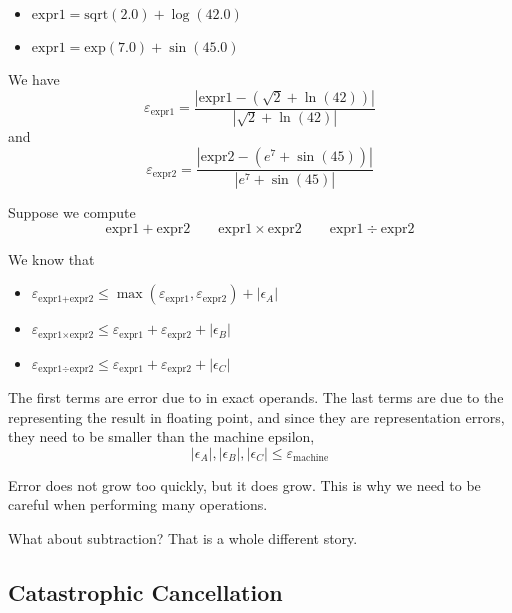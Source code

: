 \begin{example}
    \begin{itemize}
        \item \( \text{expr1} = \text{sqrt}(2.0) + \log(42.0) \)
        \item \( \text{expr1} = \text{exp}(7.0) + \sin(45.0) \)
    \end{itemize}

    We have \[
        \varepsilon_{\text{expr1}} = \frac{|\text{expr1} - (\sqrt{2} + \ln(42))|}{|\sqrt{2} + \ln(42)|}
    \] and \[
        \varepsilon_{\text{expr2}} = \frac{|\text{expr2} - (e^7 + \sin(45))|}{|e^7 + \sin(45)|}
    \]

    Suppose we compute \[
        \text{expr1} + \text{expr2} \qquad \text{expr1} \times \text{expr2} \qquad \text{expr1} \div \text{expr2}
    \]

    We know that
    \begin{itemize}
        \item \( \varepsilon_{\text{expr1} + \text{expr2}} \leq \max( \varepsilon_{\text{expr1}}, \varepsilon_{\text{expr2}}) + | \epsilon_A | \)
        \item \( \varepsilon_{\text{expr1} \times \text{expr2}} \leq \varepsilon_{\text{expr1}} + \varepsilon_{\text{expr2}} + | \epsilon_B | \)
        \item \( \varepsilon_{\text{expr1} \div \text{expr2}} \leq \varepsilon_{\text{expr1}} + \varepsilon_{\text{expr2}} + | \epsilon_C | \)
    \end{itemize}

    The first terms are error due to in exact operands. The last terms are due to the representing the result in floating point, and since they are representation errors, they need to be smaller than the machine epsilon, \[
        | \epsilon_A |, | \epsilon_B |, | \epsilon_C | \leq \varepsilon_{\text{machine}}
    \]
\end{example}

\begin{remark}
    Error does not grow too quickly, but it does grow. This is why we need to be careful when performing many operations.
\end{remark}

What about subtraction? That is a whole different story.

\subsection{Catastrophic Cancellation}

